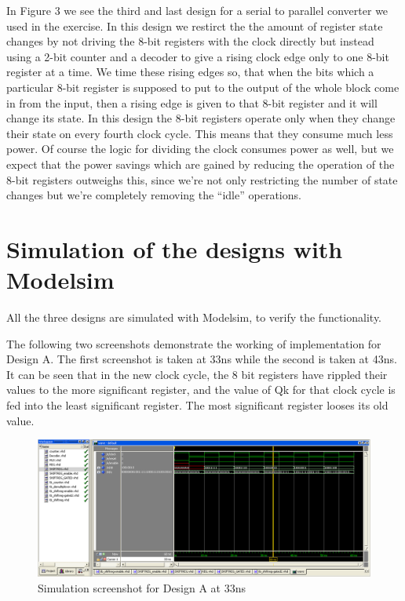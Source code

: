 \documentclass[11pt,a4paper]{article}
\begin{document}
In Figure 3 we see the third and last design for a serial to parallel converter we used in the exercise. In this design we restirct the the amount of register state changes by not driving the 8-bit registers with the clock directly but instead using a 2-bit counter and a decoder to give a rising clock edge only to one 8-bit register at a time. We time these rising edges so, that when the bits which a particular 8-bit register is supposed to put to the output of the whole block come in from the input, then a rising edge is given to that 8-bit register and it will change its state. In this design the 8-bit registers operate only when they change their state on every fourth clock cycle. This means that they consume much less power. Of course the logic for dividing the clock consumes power as well, but we expect that the power savings which are gained by reducing the operation of the 8-bit registers outweighs this, since we're not only restricting the number of state changes but we're completely removing the ``idle'' operations.


\newpage
\section{Simulation of the designs with Modelsim}
\label{section:simulation}
All the three designs are simulated with Modelsim, to verify the functionality.
 
The following two screenshots demonstrate the working of implementation for Design A. The first screenshot is taken at 33ns while the second is taken at 43ns. It can be seen that in the new clock cycle, the 8 bit registers have rippled their values to the more significant register, and the value of Qk for that clock cycle is fed into the least significant register. The most significant register looses its old value.

\begin{figure}[htp]
\centering
\includegraphics[length = 4in,width = 6.5in]{./images/simsr1.png}
\caption{Simulation screenshot for Design A at 33ns}
\end{figure}
\end{document}
